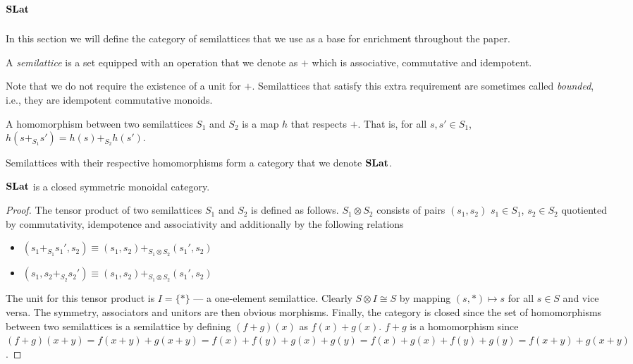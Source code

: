 \section{\texorpdfstring{$\mathbf{SLat}$}{SLat}}
\label{sec:appendix:slat}

In this section we will define the category of semilattices that we use as a base for enrichment throughout the paper.

\begin{defi}[Semilattice]
	A \textit{semilattice} is a set equipped with an operation that we denote as $+$ which is associative, commutative and idempotent.
\end{defi}

Note that we do not require the existence of a unit for $+$.
Semilattices that satisfy this extra requirement are sometimes called \textit{bounded}, i.e., they are idempotent commutative monoids.

\begin{defi}
	A homomorphism between two semilattices $S_{1}$ and $S_{2}$ is a map $h$ that respects $+$.
	That is, for all $s,s' \in S_{1}$, $h(s +_{S_{1}} s') = h(s) +_{S_{2}} h(s')$.
\end{defi}

\begin{defi}
	Semilattices with their respective homomorphisms form a category that we denote $\mathbf{SLat}$.
\end{defi}

\begin{prop}
	$\mathbf{SLat}$ is a closed symmetric monoidal category.
\end{prop}
\begin{proof}
	The tensor product of two semilattices $S_{1}$ and $S_{2}$ is defined as follows.
	$S_{1} \otimes S_{2}$ consists of pairs $(s_1,s_2)$ $s_{1} \in S_{1}$, $s_{2} \in S_{2}$ quotiented by commutativity, idempotence and associativity and additionally by the following relations
	\begin{itemize}
		\item $(s_{1} +_{S_{1}} s_{1}',s_{2}) \equiv (s_{1},s_{2}) +_{S_{1} \otimes S_{2}} (s_{1}',s_{2})$
		\item $(s_{1}, s_{2} +_{S_{2}} s_{2}') \equiv (s_{1},s_{2}) +_{S_{1} \otimes S_{2}} (s_{1}',s_{2})$
	\end{itemize}

	The unit for this tensor product is $I = \{*\}$ --- a one-element semilattice.
	Clearly $S \otimes I \cong S$ by mapping $(s,*) \mapsto s$ for all $s \in S$ and vice versa.
	The symmetry, associators and unitors are then obvious morphisms.
	Finally, the category is closed since the set of homomorphisms between two semilattices is a semilattice by defining $(f + g)(x)$ as $f(x) + g(x)$.
	$f + g$ is a homomorphism since $(f + g)(x+y) = f(x+y) + g(x+y) = f(x) + f(y) + g(x) + g(y) = f(x) + g(x) + f(y) + g(y) = f(x+y) + g(x+y)$.
\end{proof}

